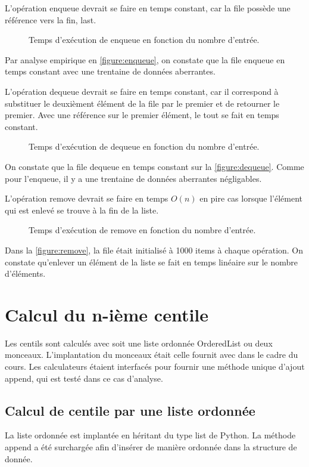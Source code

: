 \documentclass[french]{article}
\begin{document}
L'opération enqueue devrait se faire en temps constant, car la file possède une
référence vers la fin, \textsf{last}.

\begin{figure}
  \centering
  \caption{Temps d'exécution de \textsf{enqueue} en fonction du nombre d'entrée.}
  \label{figure:enqueue}
  
\end{figure}

Par analyse empirique en \autoref{figure:enqueue}, on constate que la file
enqueue en temps constant avec une trentaine de données aberrantes.

L'opération dequeue devrait se faire en temps constant, car il correspond à
substituer le deuxièment élément de la file par le premier et de retourner le
premier. Avec une référence sur le premier élément, le tout se fait en temps
constant.

\begin{figure}
  \centering
  \caption{Temps d'exécution de \textsf{dequeue} en fonction du nombre d'entrée.}
  \label{figure:dequeue}
  
\end{figure}
On constate que la file dequeue en temps constant sur la
\autoref{figure:dequeue}. Comme pour l'enqueue, il y a une trentaine de données
aberrantes négligables.

L'opération \textsf{remove} devrait se faire en temps $O(n)$ en pire cas lorsque
l'élément qui est enlevé se trouve à la fin de la liste.

\begin{figure}
  \centering
  \caption{Temps d'exécution de \textsf{remove} en fonction du nombre d'entrée.}
  \label{figure:remove}
  
\end{figure}
Dans la \autoref{figure:remove}, la file était initialisé à 1000 items à chaque
opération. On constate qu'enlever un élément de la liste se fait en temps
linéaire sur le nombre d'éléments.

\section{Calcul du n-ième centile}
Les centils sont calculés avec soit une liste ordonnée \textsf{OrderedList} ou
deux monceaux. L'implantation du monceaux était celle fournit avec dans le cadre
du cours. Les calculateurs étaient interfacés pour fournir une méthode unique
d'ajout \textsf{append}, qui est testé dans ce cas d'analyse.

\subsection{Calcul de centile par une liste ordonnée}
La liste ordonnée est implantée en héritant du type \textsf{list} de Python. La
méthode \textsf{append} a été surchargée afin d'insérer de manière ordonnée dans
la structure de donnée.
\end{document}

